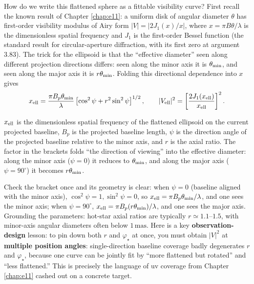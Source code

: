 How do we write this flattened sphere as a fittable visibility curve? First recall the known result of Chapter \ref{chap:e11}: a uniform disk of angular diameter \(\theta\) has first-order visibility modulus of Airy form \(|V|=|2J_1(x)/x|\), where \(x=\pi B\theta/\lambda\) is the dimensionless spatial frequency and \(J_1\) is the first-order Bessel function (the standard result for circular-aperture diffraction, with its first zero at argument \(3.83\)). The trick for the ellipsoid is that the ``effective diameter'' seen along different projection directions differs: seen along the minor axis it is \(\theta_{\rm min}\), and seen along the major axis it is \(r\theta_{\rm min}\). Folding this directional dependence into \(x\) gives
\begin{equation}
  x_{\rm ell}
  =
  \frac{\pi B_p\theta_{\rm min}}{\lambda}
  \left[
  \cos^2\psi
  +
  r^2\sin^2\psi
  \right]^{1/2},
  \qquad
  |V_{\rm ell}|^2
  =
  \left[\frac{2J_1(x_{\rm ell})}{x_{\rm ell}}\right]^2 .
  \label{eq:e25-elliptical-visibility}
\end{equation}
\begin{formulaexplain}
\(x_{\rm ell}\) is the dimensionless spatial frequency of the flattened ellipsoid on the current projected baseline, \(B_p\) is the projected baseline length, \(\psi\) is the direction angle of the projected baseline relative to the minor axis, and \(r\) is the axial ratio. The factor in the brackets folds ``the direction of viewing'' into the effective diameter: along the minor axis (\(\psi=0\)) it reduces to \(\theta_{\rm min}\), and along the major axis (\(\psi=90^\circ\)) it becomes \(r\theta_{\rm min}\).
\end{formulaexplain}
Check the bracket once and its geometry is clear: when \(\psi=0\) (baseline aligned with the minor axis), \(\cos^2\psi=1,\sin^2\psi=0\), so \(x_{\rm ell}=\pi B_p\theta_{\rm min}/\lambda\), and one sees the minor axis; when \(\psi=90^\circ\), \(x_{\rm ell}=\pi B_p(r\theta_{\rm min})/\lambda\), and one sees the major axis. Grounding the parameters: hot-star axial ratios are typically \(r\simeq1.1\text{--}1.5\), with minor-axis angular diameters often below \(1\,\mathrm{mas}\). Here is a key \textbf{observation-design} lesson: to pin down both \(r\) and \(\varphi_\star\) at once, you must obtain \(|V|^2\) at \textbf{multiple position angles}: single-direction baseline coverage badly degenerates \(r\) and \(\varphi_\star\), because one curve can be jointly fit by ``more flattened but rotated'' and ``less flattened.'' This is precisely the language of uv coverage from Chapter \ref{chap:e11} cashed out on a concrete target.

